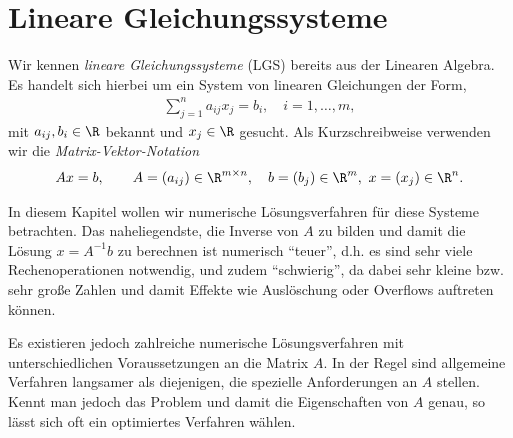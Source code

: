 \section{Lineare Gleichungssysteme}
Wir kennen \emph{lineare Gleichungssysteme} (LGS) bereits aus der Linearen
Algebra. Es handelt sich hierbei um ein System von linearen Gleichungen der Form,
\begin{align*}
\sum\limits_{j=1}^n a_{ij}x_j = b_i,\quad i = 1,\ldots,m,
\end{align*}
mit $a_{ij}, b_i\in\R$ bekannt und $x_j\in\R$ gesucht.
Als Kurzschreibweise verwenden wir die \emph{Matrix-Vektor-Notation}
\begin{align*}
Ax= b,\qquad A=(a_{ij})\in\R^{m\times n},\quad b = (b_j)\in\R^m,\
x=(x_j)\in\R^n.
\end{align*}

In diesem Kapitel wollen wir numerische Lösungsverfahren für diese Systeme
betrachten. Das naheliegendste, die Inverse von $A$ zu bilden und damit die
Lösung $x=A^{-1}b$ zu berechnen ist numerisch ``teuer'', d.h. es sind sehr
viele Rechenoperationen notwendig, und zudem ``schwierig'', da dabei sehr
kleine bzw. sehr große Zahlen und damit Effekte wie Auslöschung oder Overflows
auftreten können.

Es existieren jedoch zahlreiche numerische Lösungsverfahren mit
unterschiedlichen Voraussetzungen an die Matrix $A$. In der Regel sind
allgemeine Verfahren langsamer als diejenigen, die spezielle Anforderungen an
$A$ stellen. Kennt man jedoch das Problem und damit die Eigenschaften von $A$
genau, so lässt sich oft ein optimiertes Verfahren wählen.

